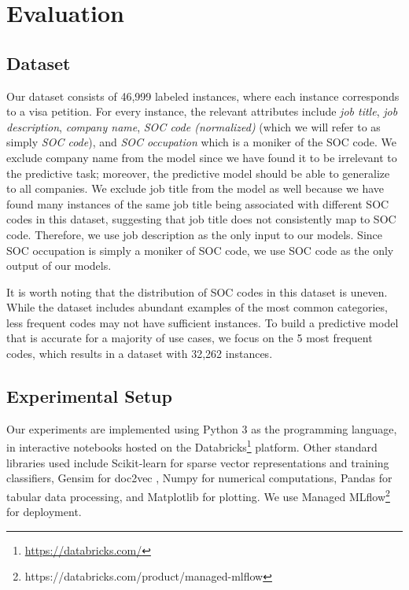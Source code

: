 \section{Evaluation}
\label{sec:Evaluation}

\subsection{Dataset}

Our dataset consists of 46,999 labeled instances, where each instance corresponds to a visa petition. For every instance, the relevant attributes include \textit{job title}, \textit{job description}, \textit{company name}, \textit{SOC code (normalized)} (which we will refer to as simply \textit{SOC code}), and \textit{SOC occupation} which is a moniker of the SOC code. We exclude company name from the model since we have found it to be irrelevant to the predictive task; moreover, the predictive model should be able to generalize to all companies. We exclude job title from the model as well because we have found many instances of the same job title being associated with different SOC codes in this dataset, suggesting that job title does not consistently map to SOC code. Therefore, we use job description as the only input to our models. Since SOC occupation is simply a moniker of SOC code, we use SOC code as the only output of our models.

It is worth noting that the distribution of SOC codes in this dataset is uneven. While the dataset includes abundant examples of the most common categories, less frequent codes may not have sufficient instances. To build a predictive model that is accurate for a majority of use cases, we focus on the 5 most frequent codes, which results in a dataset with 32,262 instances.

\subsection{Experimental Setup}

Our experiments are implemented using Python 3 as the programming language, in interactive notebooks hosted on the Databricks\footnote{\url{https://databricks.com/}} platform. Other standard libraries used include Scikit-learn \cite{scikit-learn} for sparse vector representations and training classifiers, Gensim for doc2vec  \cite{rehurek_lrec}, Numpy \cite{numpy} for numerical computations, Pandas \cite{pandas} for tabular data processing, and Matplotlib \cite{matplotlib} for plotting. We use Managed MLflow\footnote{https://databricks.com/product/managed-mlflow} for deployment.

